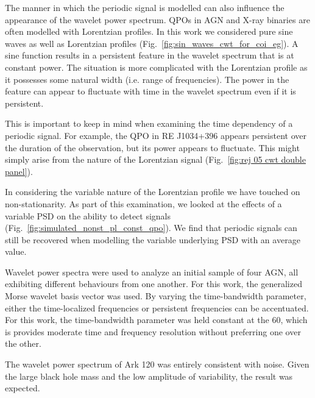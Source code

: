 \documentclass[fleqn,usenatbib]{mnras}
\begin{document}

The manner in which the periodic signal is modelled can also influence the appearance of the wavelet power spectrum.  QPOs in AGN and X-ray binaries are often modelled with Lorentzian profiles.  In this work we considered pure sine waves as well as Lorentzian profiles (Fig.~\ref{fig:sin_waves_cwt_for_coi_eg}).  A sine function results in a persistent feature in the wavelet spectrum that is at constant power.  The situation is more complicated with the Lorentzian profile as it possesses some natural width (i.e. range of frequencies).  The power in the feature can appear to fluctuate with time in the wavelet spectrum even if it is persistent.

This is important to keep in mind when examining the time dependency of a periodic signal.  For example, the QPO in RE J1034+396 appears persistent over the duration of the observation, but its power appears to fluctuate.  This might simply arise from the nature of the Lorentzian signal (Fig.~\ref{fig:rej 05 cwt double panel}).


In considering the variable nature of the Lorentzian profile we have touched on non-stationarity.  As part of this examination, we looked at the effects of a variable PSD on the ability to detect signals (Fig.~\ref{fig:simulated_nonst_pl_const_qpo}).   We find that periodic signals can still be recovered when modelling the variable underlying PSD with an average value. 


Wavelet power spectra were used to analyze an initial sample of four AGN, all exhibiting different behaviours from one another. For this work, the generalized Morse wavelet basis vector was used. By varying the time-bandwidth parameter, either the time-localized frequencies or persistent frequencies can be accentuated. For this work, the time-bandwidth parameter was held constant at the 60, which is provides moderate time and frequency resolution without preferring one over the other.

The wavelet power spectrum of Ark 120 was entirely consistent with noise. Given the large black hole mass and the low amplitude of variability, the result was expected. 
\end{document}
